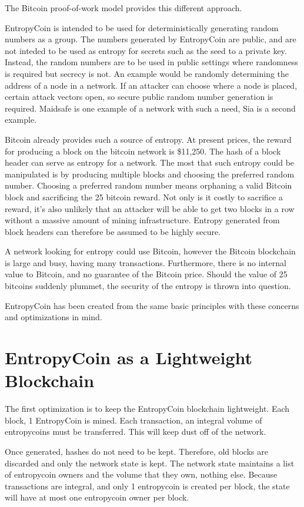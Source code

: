 \documentclass[twocolumn]{article}
\begin{document}
The Bitcoin proof-of-work model provides this different approach.


EntropyCoin is intended to be used for deterministically generating random numbers as a group.
The numbers generated by EntropyCoin are public, and are not inteded to be used as entropy for secrets such as the seed to a private key.
Instead, the random numbers are to be used in public settings where randomness is required but secrecy is not.
An example would be randomly determining the address of a node in a network.
If an attacker can choose where a node is placed, certain attack vectors open, so secure public random number generation is required.
Maidsafe is one example of a network with such a need, Sia is a second example.

Bitcoin already provides such a source of entropy.
At present prices, the reward for producing a block on the bitcoin network is \$11,250.
The hash of a block header can serve as entropy for a network.
The most that such entropy could be manipulated is by producing multiple blocks and choosing the preferred random number.
Choosing a preferred random number means orphaning a valid Bitcoin block and sacrificing the 25 bitcoin reward.
Not only is it costly to sacrifice a reward, it's also unlikely that an attacker will be able to get two blocks in a row without a massive amount of mining infrastructure.
Entropy generated from block headers can therefore be assumed to be highly secure.

A network looking for entropy could use Bitcoin, however the Bitcoin blockchain is large and busy, having many transactions.
Furthermore, there is no internal value to Bitcoin, and no guarantee of the Bitcoin price.
Should the value of 25 bitcoins suddenly plummet, the security of the entropy is thrown into question.

EntropyCoin has been created from the same basic principles with these concerns and optimizations in mind.

\section{EntropyCoin as a Lightweight Blockchain}
The first optimization is to keep the EntropyCoin blockchain lightweight.
Each block, 1 EntropyCoin is mined.
Each transaction, an integral volume of entropycoins must be transferred.
This will keep dust off of the network.

Once generated, hashes do not need to be kept.
Therefore, old blocks are discarded and only the network state is kept.
The network state maintains a list of entropycoin owners and the volume that they own, nothing else.
Because transactions are integral, and only 1 entropycoin is created per block, the state will have at most one entropycoin owner per block.
\end{document}
